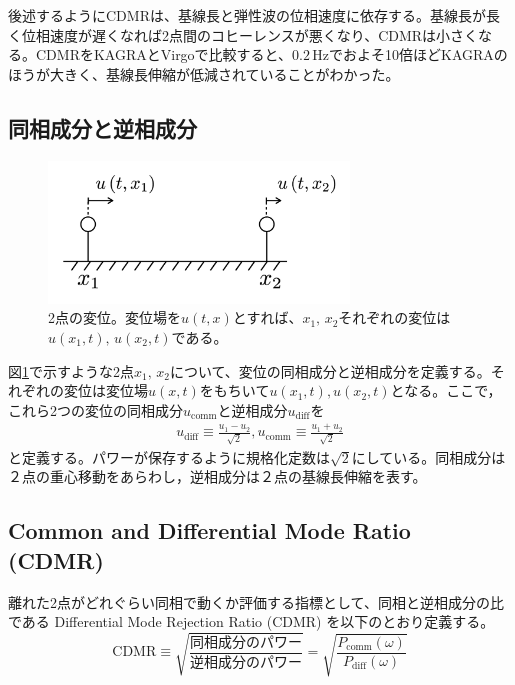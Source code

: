 \documentclass[a4paper,12pt]{jsarticle}
\begin{document}
後述するようにCDMRは、基線長と弾性波の位相速度に依存する。基線長が長く位相速度が遅くなれば2点間のコヒーレンスが悪くなり、CDMRは小さくなる。CDMRをKAGRAとVirgoで比較すると、$0.2\, \mathrm{Hz}$でおよそ10倍ほどKAGRAのほうが大きく、基線長伸縮が低減されていることがわかった。

\subsection{同相成分と逆相成分}
\begin{figure}[H]
  \begin{center}
    \includegraphics[width=8.0cm]{./img_cdmr_xarm.png}
  \end{center}
  \caption{2点の変位。変位場を$u(t,x)$とすれば、$x_1,\,x_2$それぞれの変位は$u(x_1,t),\,u(x_2,t)$である。}\label{img:img_diffcomm}
\end{figure}

図\ref{img:img_diffcomm}で示すような2点$x_1,\,x_2$について、変位の同相成分と逆相成分を定義する。それぞれの変位は変位場$u(x,t)$をもちいて$u(x_1,t),u(x_2,t)$となる。ここで，これら2つの変位の同相成分$u_{\mathrm{comm}}$と逆相成分$u_\mathrm{diff}$を
\begin{eqnarray}\label{eq:eq22}
  u_{\mathrm{diff}} \equiv \frac{u_{1}-u_{2}}{\sqrt{2}},
  u_{\mathrm{comm}}  \equiv \frac{u_{1}+u_{2}}{\sqrt{2}}
\end{eqnarray}
と定義する。パワーが保存するように規格化定数は$\sqrt{2}$にしている。同相成分は２点の重心移動をあらわし，逆相成分は２点の基線長伸縮を表す。


\subsection{Common and Differential Mode Ratio (CDMR)}
離れた2点がどれぐらい同相で動くか評価する指標として、同相と逆相成分の比である Differential Mode Rejection Ratio (CDMR) を以下のとおり定義する。
\begin{equation}
  \boxed{\mathrm{CDMR} \equiv \sqrt{\frac{同相成分のパワー}{逆相成分のパワー}} = \sqrt{\frac{P_{\mathrm{comm}}(\omega)}{P_{\mathrm{diff}}(\omega)}}} \label{eq:eq23}
\end{equation}
\end{document}
